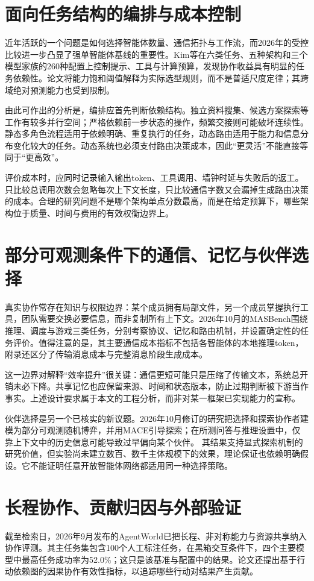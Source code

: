 \documentclass[UTF8,a4paper,fontset=fandol,zihao=5,openany]{ctexrep}
\begin{document}
\section{面向任务结构的编排与成本控制}
近年活跃的一个问题是如何选择智能体数量、通信拓扑与工作流，而2026年的受控比较进一步凸显了强单智能体基线的重要性。Kim等在六类任务、五种架构和三个模型家族的260种配置上控制提示、工具与计算预算，发现协作收益具有明显的任务依赖性。论文将能力饱和阈值解释为实际选型规则，而不是普适尺度定律；其跨域绝对预测能力也受到限制。\cite{scaling}

由此可作出的分析是，编排应首先判断依赖结构。独立资料搜集、候选方案探索等工作有较多并行空间；严格依赖前一步状态的操作，频繁交接则可能破坏连续性。静态多角色流程适用于依赖明确、重复执行的任务，动态路由适用于能力和信息分布变化较大的任务。动态系统也必须支付路由决策成本，因此“更灵活”不能直接等同于“更高效”。

评价成本时，应同时记录输入输出token、工具调用、墙钟时延与失败后的返工。只比较总调用次数会忽略每次上下文长度，只比较通信字数又会漏掉生成路由决策的成本。合理的研究问题不是哪个架构单点分数最高，而是在给定预算下，哪些架构位于质量、时间与费用的有效权衡边界上。


\section{部分可观测条件下的通信、记忆与伙伴选择}
真实协作常存在知识与权限边界：某个成员拥有局部文件，另一个成员掌握执行工具，团队需要交换必要信息，而非复制所有上下文。2026年10月的MASBench围绕推理、调度与游戏三类任务，分别考察协议、记忆和路由机制，并设置确定性的任务评价。值得注意的是，其主要通信成本指标不包括各智能体的本地推理token，附录还区分了传输消息成本与完整消息阶段生成成本。\cite{masbench}

这一边界对解释“效率提升”很关键：通信更短可能只是压缩了传输文本，系统总开销未必下降。共享记忆也应保留来源、时间和状态版本，防止过期判断被下游当作事实。上述设计要求属于本文的工程分析，而非对某一框架已实现能力的宣称。

伙伴选择是另一个已核实的新议题。2026年10月修订的研究把选择和探索协作者建模为部分可观测随机博弈，并用MACE引导探索；在所测问答与推理设置中，仅靠上下文中的历史信息可能导致过早偏向某个伙伴。\cite{exploration} 其结果支持显式探索机制的研究价值，但实验尚未建立数百、数千主体规模下的效果，理论保证也依赖明确假设。它不能证明任意开放智能体网络都适用同一种选择策略。


\section{长程协作、贡献归因与外部验证}
截至检索日，2026年9月发布的AgentWorld已把长程、非对称能力与资源共享纳入协作评测。其主任务集包含100个人工标注任务，在黑箱交互条件下，四个主要模型中最高任务成功率为52.0\%；这只是该基准与配置中的结果。论文还提出基于行动依赖图的因果协作有效性指标，以追踪哪些行动对结果产生贡献。\cite{agentworld}
\end{document}
